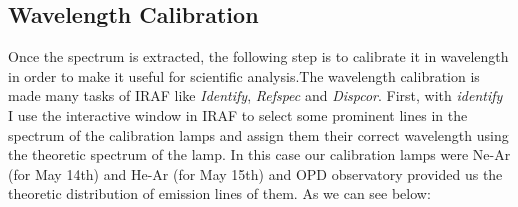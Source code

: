 \subsection{Wavelength Calibration}

Once the spectrum is extracted, the following step is to calibrate it in wavelength in order to make it useful for scientific analysis.The wavelength calibration is made many tasks of IRAF like \textit{Identify}, \textit{Refspec} and \textit{Dispcor}. First, with \textit{identify} I use the interactive window in IRAF to select some prominent lines in the spectrum of the calibration lamps and assign them their correct wavelength using the theoretic spectrum of the lamp. In this case our calibration lamps were Ne-Ar (for May 14th) and He-Ar (for May 15th)  and OPD observatory provided us the theoretic distribution of emission lines of them. As we can see below:

